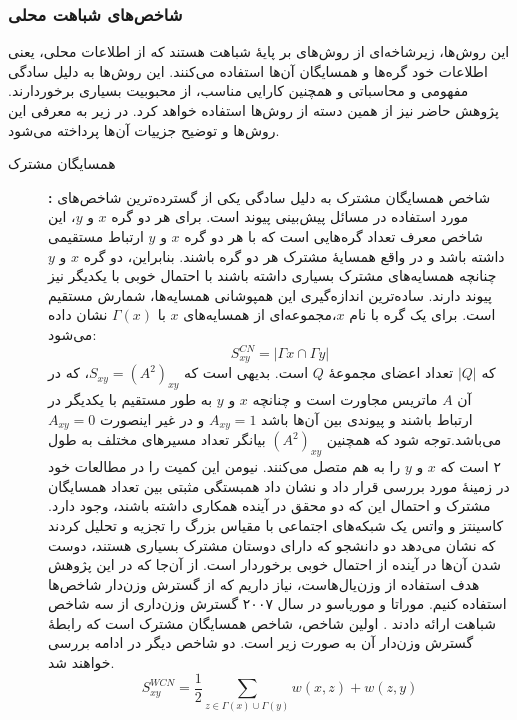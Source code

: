 \subsubsection{شاخص‌های شباهت محلی}
این روش‌ها، زیرشاخه‌ای از روش‌های بر پایهٔ شباهت هستند که از اطلاعات محلی، یعنی اطلاعات خود گره‌ها و همسایگان آن‌ها استفاده می‌کنند. این روش‌ها به دلیل سادگی مفهومی و محاسباتی و همچنین کارایی مناسب، از محبوبیت بسیاری برخوردارند. پژوهش حاضر نیز از همین دسته از روش‌ها استفاده خواهد کرد. در زیر به معرفی این روش‌ها و توضیح جزییات آن‌ها پرداخته می‌شود.
\begin{description}
\item[همسایگان مشترک ]\textbf{:}
شاخص همسایگان مشترک به دلیل سادگی یکی از گسترده‌ترین شاخص‌های مورد استفاده در مسائل پیش‌بینی پیوند است. برای هر دو گره $x$ و $y$، این شاخص معرف تعداد گره‌هایی است که با هر دو گره $x$ و $y$ ارتباط مستقیمی داشته باشد و در واقع همسایهٔ مشترک هر دو گره باشند. بنابراین، دو گره $x$ و $y$ چنانچه همسایه‌های مشترک بسیاری داشته باشند با احتمال خوبی با یکدیگر نیز پیوند دارند. ساده‌ترین اندازه‌گیری این همپوشانی همسایه‌ها، شمارش مستقیم است.
برای یک گره با نام $x$،مجموعه‌ای از همسایه‌های $x$ با $\Gamma{(x)}$ نشان داده می‌شود:
\begin{equation}\label{eq:cn}
S_{xy}^{CN} = |\Gamma{x} \cap \Gamma{y}|
\end{equation}
که $|Q|$ تعداد اعضای مجموعهٔ $Q$ است. بدیهی است که 
$S_{xy}=(A^2)_{xy}$،
که در آن $A$ ماتریس مجاورت است و چنانچه $x$ و $y$ به طور مستقیم با یکدیگر در ارتباط باشند و پیوندی بین آن‌ها باشد $A_{xy}=1$ و در غیر اینصورت $A_{xy}=0$ می‌باشد.توجه شود که همچنین $(A^2)_{xy}$ بیانگر تعداد مسیرهای مختلف به طول ۲ است که $x$ و $y$ را به هم متصل می‌کنند.
نیومن\cite{newman2001clustering} این کمیت را در مطالعات خود در زمینهٔ \CollaborationNetworks مورد بررسی قرار داد و نشان داد همبستگی مثبتی بین تعداد همسایگان مشترک و احتمال این که دو محقق در آینده همکاری داشته باشند، وجود دارد.
کاسینتز و واتس\cite{kossinets2006effects} یک شبکه‌های اجتماعی با مقیاس بزرگ را تجزیه و تحلیل کردند که نشان می‌دهد دو دانشجو که دارای دوستان مشترک بسیاری هستند، دوست شدن آن‌ها در آینده از احتمال خوبی برخوردار است.
از آن‌جا که در این پژوهش هدف استفاده از وزن‌یال‌هاست، نیاز داریم که از گسترش وزن‌دار شاخص‌ها استفاده کنیم. موراتا و موریاسو در سال ۲۰۰۷ گسترش وزن‌داری از سه شاخص شباهت ارائه دادند \cite{murata2007link}. اولین شاخص، شاخص همسایگان مشترک است که رابطهٔ گسترش وزن‌دار آن به صورت زیر است. دو شاخص دیگر در ادامه بررسی خواهند شد.
\begin{equation}
S_{xy}^{WCN} = \frac{1}{2}\sum_{z\in\Gamma(x)\cup\Gamma(y)}{w(x,z)+w(z,y)}
\end{equation}


\end{description}
